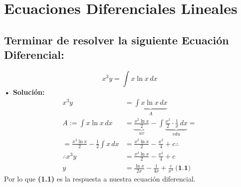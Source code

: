 \documentclass[letterpaper, 12pt]{article}
\begin{document}
\thispagestyle{fancy}
\section*{Ecuaciones Diferenciales Lineales}
\subsection*{Terminar de resolver la siguiente Ecuación Diferencial:}
\justify
\[x^3y=\int x\ln x\, dx\]
{\large \textbf{ • Solución:}
\begin{equation*}
    \begin{aligned}
        x^3y&=\underbrace{\int x\ln x\, dx}_{A}\\[5pt]
        A:= \int x\ln x\, dx&=\underbrace{\frac{x^2\ln x}{2}}_{uv}-\int \underbrace{\frac{x^2}{2}\cdot \frac{1}{x}\, dx}_{vdu}=\\[5pt]
        =\frac{x^2\ln x}{2}-\frac{1}{2}\int x\, dx&=\frac{x^2\ln x}{2}-\frac{x^2}{4}+c\therefore\\[5pt]
        \therefore x^3y&=\frac{x^2\ln x}{2}-\frac{x^2}{4}+c\\[5pt]
        y&=\frac{\ln x}{2x}-\frac{1}{4x}+\frac{c}{x^3}\: \textbf{(1.1)}
    \end{aligned}
\end{equation*}
Por lo que \textbf{(1.1)} es la respuesta a nuestra ecuación diferencial.}
\end{document}
